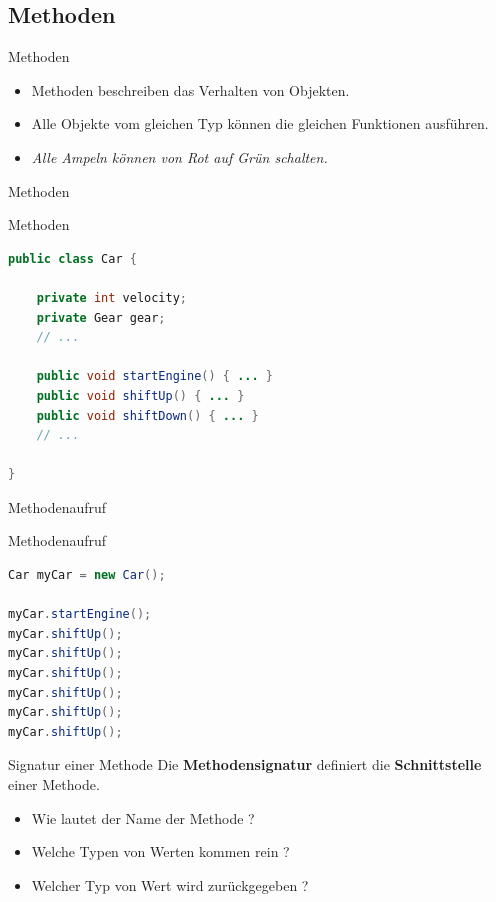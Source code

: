 \documentclass[18pt]{beamer}
\begin{document}
\subsection{Methoden}

\begin{frame}{Methoden}
    \begin{itemize}
        \item Methoden beschreiben das Verhalten von Objekten.
        \item Alle Objekte vom gleichen Typ können die gleichen Funktionen ausführen.
        \item \textit{Alle Ampeln können von Rot auf Grün schalten.}
    \end{itemize}
\end{frame}

\begin{frame}[fragile]{Methoden}
    \begin{exampleblock}{Methoden}
        \begin{lstlisting}[language=Java]
public class Car {

    private int velocity;
    private Gear gear;
    // ...

    public void startEngine() { ... }
    public void shiftUp() { ... }
    public void shiftDown() { ... }
    // ...

}
        \end{lstlisting}

    \end{exampleblock}

\end{frame}

\begin{frame}[fragile]{Methodenaufruf}
    \begin{exampleblock}{Methodenaufruf}
        \begin{lstlisting}[language=Java]
Car myCar = new Car();

myCar.startEngine();
myCar.shiftUp();
myCar.shiftUp();
myCar.shiftUp();
myCar.shiftUp();
myCar.shiftUp();
myCar.shiftUp();
        \end{lstlisting}

    \end{exampleblock}

\end{frame}


\begin{frame}{Signatur einer Methode}
    Die \textbf{Methodensignatur} definiert die \textbf{Schnittstelle} einer Methode.
    \begin{itemize}
        \item Wie lautet der Name der Methode ?
        \item Welche Typen von Werten kommen rein ?
        \item Welcher Typ von Wert wird zurückgegeben ?
    \end{itemize}
\end{frame}
\end{document}
